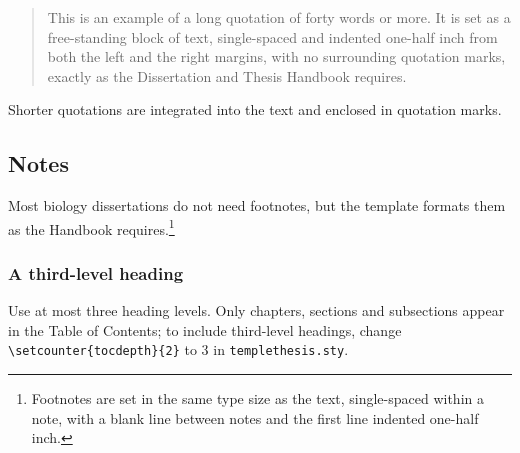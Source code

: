 \begin{quote}
This is an example of a long quotation of forty words or more. It is set as a free-standing block of text, single-spaced and indented one-half inch from both the left and the right margins, with no surrounding quotation marks, exactly as the Dissertation and Thesis Handbook requires.\cite{Lin2019structure}
\end{quote}

Shorter quotations are integrated into the text and enclosed in quotation marks.

\subsection{Notes}

Most biology dissertations do not need footnotes, but the template formats them as the Handbook requires.\footnote{Footnotes are set in the same type size as the text, single-spaced within a note, with a blank line between notes and the first line indented one-half inch.}

\subsubsection{A third-level heading}

Use at most three heading levels. Only chapters, sections and subsections appear in the Table of Contents; to include third-level headings, change \verb|\setcounter{tocdepth}{2}| to 3 in \texttt{templethesis.sty}.

